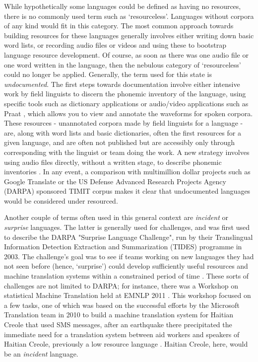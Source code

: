 While hypothetically some languages could be defined as having no resources, there is no commonly used term such as `resourceless'. Languages without corpora of any kind would fit in this category. The most common approach towards building resources for these languages generally involves either writing down basic word lists, or recording audio files or videos and using these to bootstrap language resource development. Of course, as soon as there was one audio file or one word written in the language, then the nebulous category of `resourceless' could no longer be applied. Generally, the term used for this state is {\it undocumented}. The first steps towards documentation involve either intensive work by field linguists to discern the phonemic inventory of the language, using specific tools such as dictionary applications or audio/video applications such as Praat \citep{boersma2009praat}, which allows you to view and annotate the waveforms for spoken corpora. These resources - unannotated corpora made by field linguists for a language - are, along with word lists and basic dictionaries, often the first resources for a given language, and are often not published but are accessibly only through corresponding with the linguist or team doing the work. A new strategy involves using audio files directly, without a written stage, to describe phonemic inventories \citep{kempton2014discovering,bird2014aikuma,adams2017automatic}. In any event, a comparison with multimillion dollar projects such as Google Translate or the  US Defense Advanced Research Projects Agency (DARPA) sponsored TIMIT corpus \citep{garofolo1993darpa} makes it clear that undocumented languages would be considered under resourced.

Another couple of terms often used in this general context are \textit{incident} or \textit{surprise} languages. The latter is generally used for challenges, and was first used to describe the DARPA "Surprise Language Challenge", run by their Translingual Information Detection Extraction and Summarization (TIDES) programme in 2003. The challenge's goal was to see if teams working on new languages they had not seen before (hence, `surprise') could develop sufficiently useful resources and machine translation systems within a constrained period of time \citep{oard2003surprise}. These sorts of challenges are not limited to DARPA; for instance, there was a Workshop on statistical Machine Translation held at EMNLP 2011 \citep{callison2011findings}. This workshop focused on a few tasks, one of which was based on the successful efforts by the Microsoft Translation team in 2010 to build a machine translation system for Haitian Creole that used SMS messages, after an earthquake there precipitated the immediate need for a translation system between aid workers and speakers of Haitian Creole, previously a low resource language \citep{lewis2010haitian, lewis2011crisis}. Haitian Creole, here, would be an \textit{incident} language.

